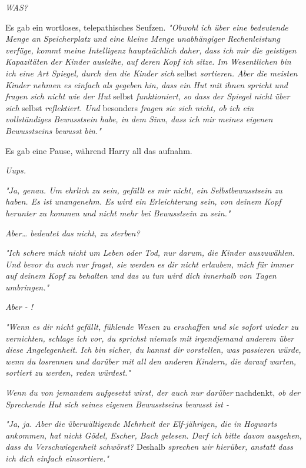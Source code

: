 {\emph{WAS?}

Es gab ein wortloses, telepathisches Seufzen. \emph{"Obwohl ich über eine bedeutende Menge an Speicherplatz und eine kleine Menge unabhängiger Rechenleistung verfüge, kommt meine Intelligenz hauptsächlich daher, dass ich mir die geistigen Kapazitäten der Kinder ausleihe, auf deren Kopf ich sitze. Im Wesentlichen bin ich eine Art Spiegel, durch den die Kinder sich} selbst \emph{sortieren. Aber die meisten Kinder nehmen es einfach als gegeben hin, dass ein Hut mit ihnen spricht und fragen sich nicht wie der Hut} selbst \emph{funktioniert, so dass der Spiegel nicht} \emph{über sich} selbst \emph{reflektiert. Und} besonders \emph{fragen sie sich nicht, ob ich ein vollständiges Bewusstsein habe, in dem Sinn, dass ich mir meines eigenen Bewusstseins bewusst bin."}

Es gab eine Pause, während Harry all das aufnahm.

\emph{Uups.}

\emph{"Ja, genau. Um ehrlich zu sein, gefällt es mir nicht, ein Selbstbewusstsein zu haben. Es ist unangenehm. Es wird ein Erleichterung sein, von deinem Kopf herunter zu kommen und nicht mehr bei Bewusstsein zu sein."}

\emph{Aber… bedeutet das nicht, zu sterben?}

\emph{"Ich schere mich nicht um Leben oder Tod, nur darum, die Kinder auszuwählen. Und bevor du auch nur fragst, sie werden es dir nicht erlauben, mich für immer auf deinem Kopf zu behalten und das zu tun wird dich innerhalb von Tagen umbringen."}

\emph{Aber - !}

\emph{"Wenn es dir nicht gefällt, fühlende Wesen zu erschaffen und sie sofort wieder zu vernichten, schlage ich vor, du sprichst niemals mit irgendjemand anderem über diese Angelegenheit. Ich bin sicher, du kannst dir vorstellen, was passieren würde, wenn du losrennen und darüber mit all den anderen Kindern, die darauf warten, sortiert zu werden, reden würdest."}

\emph{Wenn du von jemandem aufgesetzt wirst, der auch nur darüber} nachdenkt, \emph{ob der Sprechende Hut sich seines eigenen Bewusstseins bewusst ist -}

\emph{"Ja, ja. Aber die überwältigende Mehrheit der Elf-jährigen, die in Hogwarts ankommen, hat nicht Gödel, Escher, Bach gelesen. Darf ich bitte davon ausgehen, dass du Verschwiegenheit schwörst?} Deshalb \emph{sprechen wir hierüber, anstatt dass ich dich einfach einsortiere."}

}
